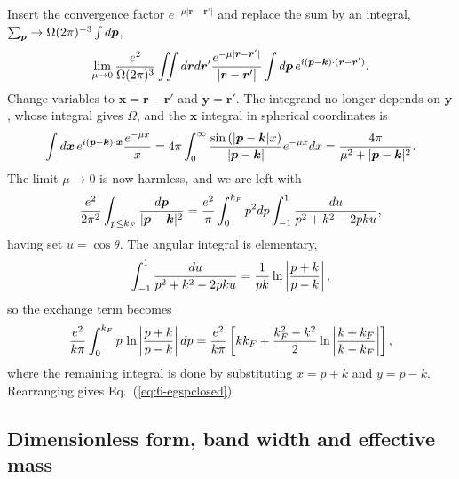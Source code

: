 Insert the convergence factor $e^{-\mu\vert\bm{r}-\bm{r}'\vert}$ and replace
the sum by an integral, $\sum_{\bm{p}}\to\Omega(2\pi)^{-3}\int d\bm{p}$,
\begin{equation}
  \lim_{\mu\to0}\frac{e^2}{\Omega(2\pi)^3}
    \iint d\bm{r}d\bm{r}'
    \frac{e^{-\mu\vert\bm{r}-\bm{r}'\vert}}{\vert\bm{r}-\bm{r}'\vert}
    \int d\bm{p}\,
      e^{i(\bm{p}-\bm{k})\cdot(\bm{r}-\bm{r}')} .
  \label{eq:6-egstep1}
\end{equation}
Change variables to $\bm{x}=\bm{r}-\bm{r}'$ and $\bm{y}=\bm{r}'$.  The
integrand no longer depends on $\bm{y}$, whose integral gives $\Omega$, and
the $\bm{x}$ integral in spherical coordinates is
\begin{equation}
  \int d\bm{x}\,e^{i(\bm{p}-\bm{k})\cdot\bm{x}}
    \frac{e^{-\mu x}}{x}
  = 4\pi\int_0^{\infty}
    \frac{\sin\left(\vert\bm{p}-\bm{k}\vert x\right)}
         {\vert\bm{p}-\bm{k}\vert}e^{-\mu x}dx
  = \frac{4\pi}{\mu^2+\vert\bm{p}-\bm{k}\vert^2}.
  \label{eq:6-egstep2}
\end{equation}
The limit $\mu\to0$ is now harmless, and we are left with
\begin{equation}
  \frac{e^2}{2\pi^2}\int_{p\le k_F}
    \frac{d\bm{p}}{\vert\bm{p}-\bm{k}\vert^2}
  = \frac{e^2}{\pi}\int_0^{k_F}p^2dp
    \int_{-1}^{1}\frac{du}{p^2+k^2-2pku},
  \label{eq:6-egstep3}
\end{equation}
having set $u=\cos\theta$.  The angular integral is elementary,
\begin{equation}
  \int_{-1}^{1}\frac{du}{p^2+k^2-2pku}
   = \frac{1}{pk}\ln\left\vert\frac{p+k}{p-k}\right\vert,
  \label{eq:6-egangular}
\end{equation}
so the exchange term becomes
\begin{equation}
  \frac{e^2}{k\pi}\int_0^{k_F}p\,
    \ln\left\vert\frac{p+k}{p-k}\right\vert dp
  = \frac{e^2}{k\pi}\left[kk_F
    + \frac{k_F^2-k^2}{2}
      \ln\left\vert\frac{k+k_F}{k-k_F}\right\vert\right],
  \label{eq:6-egstep4}
\end{equation}
where the remaining integral is done by substituting $x=p+k$ and $y=p-k$.
Rearranging gives Eq.~(\ref{eq:6-egspclosed}).

\subsection{Dimensionless form, band width and effective mass}
\label{sec:egdimensionless}

